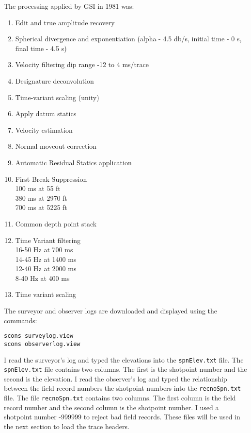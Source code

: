 The processing applied by GSI in 1981 was:
\begin{enumerate}
\item Edit and true amplitude recovery
\item Spherical divergence and exponentiation
(alpha - 4.5 db/s, initial time - 0 s, final time - 4.5 s)
\item Velocity filtering dip range -12 to 4 ms/trace
\item Designature deconvolution
\item Time-variant scaling (unity)
\item Apply datum statics
\item Velocity estimation
\item Normal moveout correction
\item Automatic Residual Statics application
\item First Break Suppression \\
100 ms at 55 ft\\
380 ms at 2970 ft\\
700 ms at 5225 ft
\item Common depth point stack
\item Time Variant filtering \\
16-50 Hz at 700 ms\\
14-45 Hz at 1400 ms\\
12-40 Hz at 2000 ms\\
8-40 Hz at 400 ms
\item Time variant scaling
\end{enumerate}

The surveyor and observer logs are downloaded and displayed using the commands:
\begin{verbatim}
scons surveylog.view 
scons observerlog.view
\end{verbatim}

I read the surveyor's log and typed the elevations into the
\texttt{spnElev.txt} file.  The \texttt{spnElev.txt} file contains two
columns.  The first is the shotpoint number and the second is the
elevation.  I read the observer's log and typed the relationship
between the field record numbers the shotpoint numbers into the
\texttt{recnoSpn.txt} file.  The file \texttt{recnoSpn.txt} contains two
columns.  The first column is the field record number and the second
column is the shotpoint number. I used a shotpoint number -999999 to
reject bad field records.  These files will be used in the next
section to load the trace headers.

